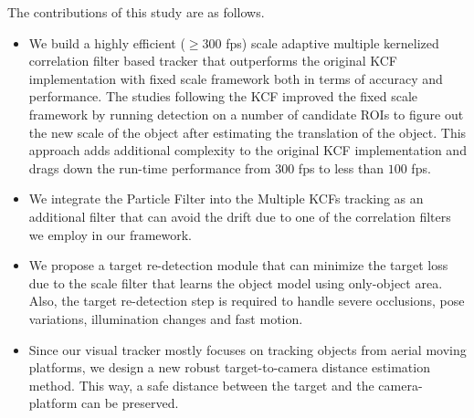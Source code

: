 \documentclass[10pt,twocolumn,letterpaper]{article}
\begin{document}
The contributions of this study are as follows.
\begin{itemize}
\item We build a highly efficient ($\geq300$ fps) scale adaptive multiple kernelized correlation filter based tracker that outperforms the original KCF implementation with fixed scale framework both in terms of accuracy and performance. The studies following the KCF improved the fixed scale framework by running detection on a number of candidate ROIs to figure out the new scale of the object after estimating the translation of the object. This approach adds additional complexity to the original KCF implementation and drags down the run-time performance from $300$ fps to less than $100$ fps.
\item We integrate the Particle Filter into the Multiple KCFs tracking as an additional filter that can avoid the drift due to one of the correlation filters we employ in our framework.
\item We propose a target re-detection module that can minimize the target loss due to the scale filter that learns the object model using only-object area. Also, the target re-detection step is required to handle severe occlusions, pose variations, illumination changes and fast motion.
\item Since our visual tracker mostly focuses on tracking objects from aerial moving platforms, we design a new robust target-to-camera distance estimation method. This way, a safe distance between the target and the camera-platform can be preserved.
\end{itemize}

\end{document}
